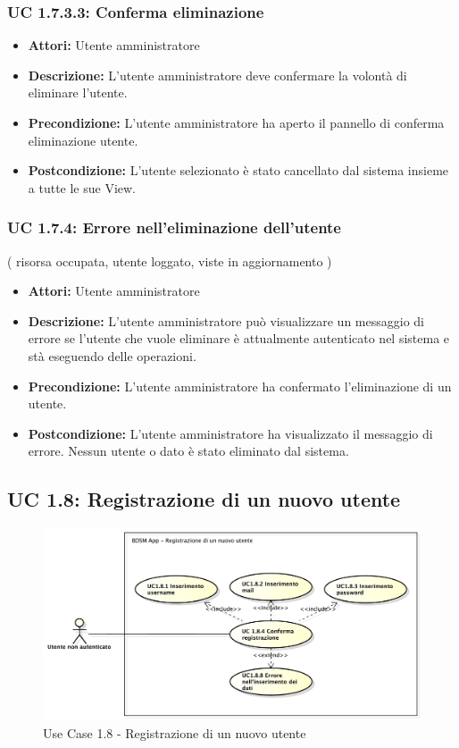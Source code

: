 \subsubsection{UC 1.7.3.3: Conferma eliminazione}

\begin{itemize}
    \item \textbf{Attori:} Utente amministratore
    \item \textbf{Descrizione:} L'utente amministratore deve confermare la volontà di eliminare l'utente.
    \item \textbf{Precondizione:} L'utente amministratore ha aperto il pannello di conferma eliminazione utente.
    \item \textbf{Postcondizione:} L'utente selezionato è stato cancellato dal sistema insieme a tutte le sue View.
\end{itemize}

\subsubsection{UC 1.7.4: Errore nell’eliminazione dell'utente}
( risorsa occupata, utente loggato, viste in aggiornamento )

\begin{itemize}
    \item \textbf{Attori:} Utente amministratore
    \item \textbf{Descrizione:} L'utente amministratore può visualizzare un messaggio di errore se l'utente che vuole eliminare è attualmente autenticato nel sistema e stà eseguendo delle operazioni.
    \item \textbf{Precondizione:} L'utente amministratore ha confermato l'eliminazione di un utente.
    \item \textbf{Postcondizione:} L'utente amministratore ha visualizzato il messaggio di errore. Nessun utente o dato è stato eliminato dal sistema.
\end{itemize}

\subsection{UC 1.8: Registrazione di un nuovo utente}

\begin{figure}[htbp]
    \centering
    \centerline{\includegraphics[scale=0.5]{./images/UC1_8.pdf}}
    \caption{Use Case 1.8 - Registrazione di un nuovo utente}
\end{figure}

